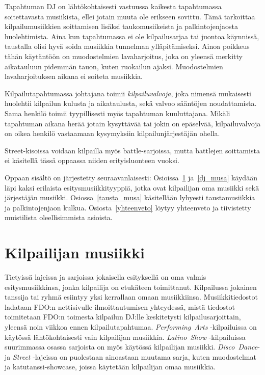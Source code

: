 \documentclass[12pt, a4paper, oneside]{article}
\begin{document}
Tapahtuman DJ on lähtökohtaisesti vastuussa kaikesta tapahtumassa soitettavasta musiikista, ellei jotain muuta ole erikseen sovittu. Tämä tarkoittaa kilpailumusiikkien soittamisen lisäksi taukomusiikeista ja palkintojenjaosta huolehtimista. Aina kun tapahtumassa ei ole kilpailusarjaa tai juontoa käynnissä, taustalla olisi hyvä soida musiikkia tunnelman ylläpitämiseksi. Ainoa poikkeus tähän käytäntöön on muodostelmien lavaharjoitus, joka on yleensä merkitty aikatauluun pidemmän tauon, kuten ruokailun ajaksi. Muodostelmien lavaharjoituksen aikana ei soiteta musiikkia.

Kilpailutapahtumassa johtajana toimii \textit{kilpailuvalvoja}, joka nimensä mukaisesti huolehtii kilpailun kulusta ja aikataulusta, sekä valvoo sääntöjen noudattamista. Sama henkilö toimii tyypillisesti myös tapahtuman kuuluttajana. Mikäli tapahtuman aikana herää jotain kysyttävää tai jokin on epäselvää, kilpailuvalvoja on oikea henkilö vastaamaan kysymyksiin kilpailunjärjestäjän ohella.

Street-kisoissa voidaan kilpailla myös battle-sarjoissa, mutta battlejen soittamista ei käsitellä tässä oppaassa niiden erityisluonteen vuoksi.

Oppaan sisältö on järjestetty seuraavanlaisesti: Osioissa~\ref{oma_musa} ja~\ref{dj_musa} käydään läpi kaksi erilaista esitysmusiikkityyppiä, jotka ovat kilpailijan oma musiikki sekä järjestäjän musiikki. Osiossa~\ref{tausta_musa} käsitellään lyhyesti taustamusiikkia ja palkintojenjaon kulkua. Osiosta~\ref{yhteenveto} löytyy yhteenveto ja tiivistetty muistilista oleellisimmista asioista.

\section{Kilpailijan musiikki} \label{oma_musa}

Tietyissä lajeissa ja sarjoissa jokaisella esityksellä on oma valmis esitysmusiikkinsa, jonka kilpailija on etukäteen toimittanut. Kilpailussa jokainen tanssija tai ryhmä esiintyy yksi kerrallaan omaan musiikkiinsa. Musiikkitiedostot ladataan FDO:n nettisivulle ilmoittautumisen yhteydessä, mistä tiedostot toimitetaan FDO:n toimesta kilpailun DJ:lle keskitetysti kilpailusarjoittain, yleensä noin viikkoa ennen kilpailutapahtumaa. \textit{Performing~Arts} -kilpailuissa on käytössä lähtökohtaisesti vain kilpailijan musiikkia. \textit{Latino~Show} -kilpailuissa suurimmassa osassa sarjoista on myös käytössä kilpailijan musiikki. \textit{Disco~Dance}- ja \textit{Street} -lajeissa on puolestaan ainoastaan muutama sarja, kuten muodostelmat ja katutanssi-showcase, joissa käytetään kilpailijan omaa musiikkia.
\end{document}
